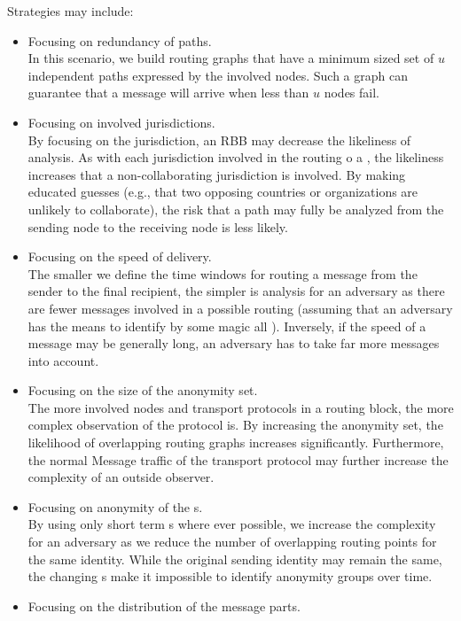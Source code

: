 Strategies may include:
\begin{itemize}
	\item Focusing on redundancy of paths.\\
	      In this scenario, we build routing graphs that have a minimum sized set of $u$ independent paths expressed by the involved nodes. Such a graph can guarantee that a message will arrive when less than $u$ nodes fail.
	\item Focusing on involved jurisdictions.\\
	      By focusing on the jurisdiction, an RBB may decrease the likeliness of analysis. As with each jurisdiction involved in the routing o a \VortexMessage{}, the likeliness increases that a non-collaborating jurisdiction is involved. By making educated guesses (e.g., that two opposing countries or organizations are unlikely to collaborate), the risk that a path may fully be analyzed from the sending node to the receiving node is less likely.
	\item Focusing on the speed of delivery.\\
	      The smaller we define the time windows for routing a message from the sender to the final recipient, the simpler is analysis for an adversary as there are fewer messages involved in a possible routing (assuming that an adversary has the means to identify by some magic all \VortexMessages). Inversely, if the speed of a message may be generally long, an adversary has to take far more messages into account.
	\item Focusing on the size of the anonymity set.\\
	      The more involved nodes and transport protocols in a routing block, the more complex observation of the protocol is. By increasing the anonymity set, the likelihood of overlapping routing graphs increases significantly. Furthermore, the normal Message traffic of the transport protocol may further increase the complexity of an outside observer.
	\item Focusing on anonymity of the s.\\
	      By using only short term s where ever possible, we increase the complexity for an adversary as we reduce the number of overlapping routing points for the same identity. While the original sending identity may remain the same, the changing s make it impossible to identify anonymity groups over time.
	\item Focusing on the distribution of the message parts.\\

\end{itemize}
